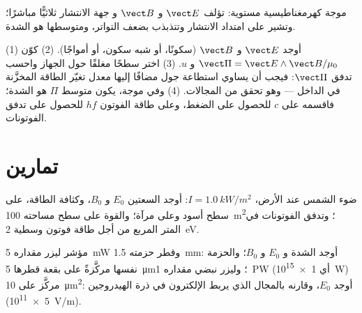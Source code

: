 \begin{omfigure}

{\small موجة كهرمغناطيسية مستوية: تؤلف $\vect E$ و $\vect B$ و
جهة الانتشار ثلاثيًّا مباشرًا؛ وتشير  على امتداد الانتشار وتتذبذب بضعف
التواتر، ومتوسطها هو الشدة.}
\end{omfigure}

\begin{method}\label{met:b2:poynting-vector:method}
(1) أوجد $\vect E$ و $\vect B$ (سكونًا، أو شبه سكون، أو أمواجًا). (2)
كوّن $\vect\Pi = \vect E\wedge\vect B/\mu_0$ و $u$. (3) اختر سطحًا مغلقًا
حول الجهاز واحسب تدفق $\vect\Pi$: فيجب أن
يساوي استطاعة جول مضافًا إليها معدل تغيّر الطاقة المخزَّنة
في الداخل --- وهو تحقق من المجالات. (4) وفي موجة، يكون متوسط $\Pi$
هو الشدة؛ فاقسمه على $c$ للحصول على الضغط، وعلى طاقة الفوتون
$hf$ للحصول على تدفق الفوتونات.
\end{method}

\section{تمارين}

\begin{exercise}[$\star$]\label{exo:b2:poynting-vector:1}
ضوء الشمس عند الأرض، $I = \qty{1.0}{kW/m^2}$: أوجد السعتين $E_0$ و $B_0$،
وكثافة الطاقة،  على سطح أسود وعلى مرآة؛
والقوة على سطح مساحته \qty{100}{m^2}؛ وتدفق الفوتونات في المتر المربع من أجل
طاقة فوتون وسطية \qty{2}{eV}.
\end{exercise}

\begin{exercise}[$\star$]\label{exo:b2:poynting-vector:2}
مؤشر ليزر مقداره \qty{5}{mW} وقطر حزمته \qty{1.5}{mm}: أوجد الشدة و $E_0$
و $B_0$؛ والحزمة نفسها مركَّزةً على بقعة قطرها \qty{5}{\micro m}؛ وليزر نبضي
مقداره \qty{1}{PW} (أي \qty{1e15}{W}) مركَّز على \qty{10}{\micro m^2}: أوجد $E_0$، وقارنه
بالمجال الذي يربط الإلكترون في ذرة الهيدروجين (\qty{5e11}{V/m}).
\end{exercise}

